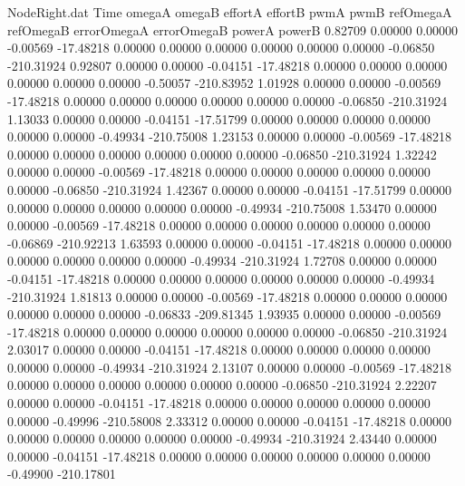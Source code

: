 \begin{filecontents}{NodeRight.dat}
Time omegaA omegaB effortA effortB pwmA pwmB refOmegaA refOmegaB errorOmegaA errorOmegaB powerA powerB
   0.82709    0.00000    0.00000    -0.00569  -17.48218    0.00000    0.00000    0.00000    0.00000    0.00000    0.00000   -0.06850 -210.31924
   0.92807    0.00000    0.00000    -0.04151  -17.48218    0.00000    0.00000    0.00000    0.00000    0.00000    0.00000   -0.50057 -210.83952
   1.01928    0.00000    0.00000    -0.00569  -17.48218    0.00000    0.00000    0.00000    0.00000    0.00000    0.00000   -0.06850 -210.31924
   1.13033    0.00000    0.00000    -0.04151  -17.51799    0.00000    0.00000    0.00000    0.00000    0.00000    0.00000   -0.49934 -210.75008
   1.23153    0.00000    0.00000    -0.00569  -17.48218    0.00000    0.00000    0.00000    0.00000    0.00000    0.00000   -0.06850 -210.31924
   1.32242    0.00000    0.00000    -0.00569  -17.48218    0.00000    0.00000    0.00000    0.00000    0.00000    0.00000   -0.06850 -210.31924
   1.42367    0.00000    0.00000    -0.04151  -17.51799    0.00000    0.00000    0.00000    0.00000    0.00000    0.00000   -0.49934 -210.75008
   1.53470    0.00000    0.00000    -0.00569  -17.48218    0.00000    0.00000    0.00000    0.00000    0.00000    0.00000   -0.06869 -210.92213
   1.63593    0.00000    0.00000    -0.04151  -17.48218    0.00000    0.00000    0.00000    0.00000    0.00000    0.00000   -0.49934 -210.31924
   1.72708    0.00000    0.00000    -0.04151  -17.48218    0.00000    0.00000    0.00000    0.00000    0.00000    0.00000   -0.49934 -210.31924
   1.81813    0.00000    0.00000    -0.00569  -17.48218    0.00000    0.00000    0.00000    0.00000    0.00000    0.00000   -0.06833 -209.81345
   1.93935    0.00000    0.00000    -0.00569  -17.48218    0.00000    0.00000    0.00000    0.00000    0.00000    0.00000   -0.06850 -210.31924
   2.03017    0.00000    0.00000    -0.04151  -17.48218    0.00000    0.00000    0.00000    0.00000    0.00000    0.00000   -0.49934 -210.31924
   2.13107    0.00000    0.00000    -0.00569  -17.48218    0.00000    0.00000    0.00000    0.00000    0.00000    0.00000   -0.06850 -210.31924
   2.22207    0.00000    0.00000    -0.04151  -17.48218    0.00000    0.00000    0.00000    0.00000    0.00000    0.00000   -0.49996 -210.58008
   2.33312    0.00000    0.00000    -0.04151  -17.48218    0.00000    0.00000    0.00000    0.00000    0.00000    0.00000   -0.49934 -210.31924
   2.43440    0.00000    0.00000    -0.04151  -17.48218    0.00000    0.00000    0.00000    0.00000    0.00000    0.00000   -0.49900 -210.17801

\end{filecontents}
